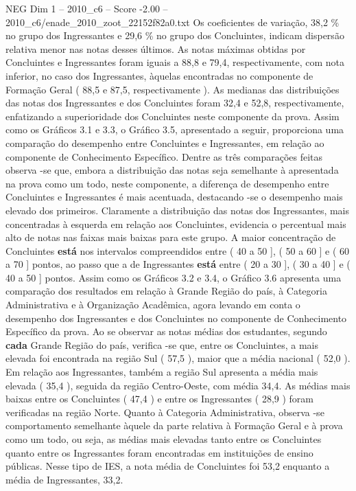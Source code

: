 \begin{textsample}{NEG Dim 1 – 2010\_c6 – Score -2.00 – 2010\_c6/enade\_2010\_zoot\_22152f82a0.txt}
Os coeficientes de variação, 38,2 \% no grupo dos Ingressantes e 29,6 \% no grupo dos Concluintes, indicam dispersão relativa menor nas notas desses últimos.
As notas máximas obtidas por Concluintes e Ingressantes foram iguais a 88,8 e 79,4, respectivamente, com nota inferior, no caso dos Ingressantes, àquelas encontradas no componente de Formação Geral ( 88,5 e 87,5, respectivamente ).
As medianas das distribuições das notas dos Ingressantes e dos Concluintes foram 32,4 e 52,8, respectivamente, enfatizando a superioridade dos Concluintes neste componente da prova.
Assim como os Gráficos 3.1 e 3.3, o Gráfico 3.5, apresentado a seguir, proporciona uma comparação do desempenho entre Concluintes e Ingressantes, em relação ao componente de Conhecimento Específico.
Dentre as três comparações feitas observa -se que, embora a distribuição das notas seja semelhante à apresentada na prova como um todo, neste componente, a diferença de desempenho entre Concluintes e Ingressantes é mais acentuada, destacando -se o desempenho mais elevado dos primeiros.
Claramente a distribuição das notas dos Ingressantes, mais concentradas à esquerda em relação aos Concluintes, evidencia o percentual mais alto de notas nas faixas mais baixas para este grupo.
A maior concentração de Concluintes \textbf{está} nos intervalos compreendidos entre ( 40 a 50 ], ( 50 a 60 ] e ( 60 a 70 ] pontos, ao passo que a de Ingressantes \textbf{está} entre ( 20 a 30 ], ( 30 a 40 ] e ( 40 a 50 ] pontos.
Assim como os Gráficos 3.2 e 3.4, o Gráfico 3.6 apresenta uma comparação dos resultados em relação à Grande Região do país, à Categoria Administrativa e à Organização Acadêmica, agora levando em conta o desempenho dos Ingressantes e dos Concluintes no componente de Conhecimento Específico da prova.
Ao se observar as notas médias dos estudantes, segundo \textbf{cada} Grande Região do país, verifica -se que, entre os Concluintes, a mais elevada foi encontrada na região Sul ( 57,5 ), maior que a média nacional ( 52,0 ).
Em relação aos Ingressantes, também a região Sul apresenta a média mais elevada ( 35,4 ), seguida da região Centro-Oeste, com média 34,4.
As médias mais baixas entre os Concluintes ( 47,4 ) e entre os Ingressantes ( 28,9 ) foram verificadas na região Norte.
Quanto à Categoria Administrativa, observa -se comportamento semelhante àquele da parte relativa à Formação Geral e à prova como um todo, ou seja, as médias mais elevadas tanto entre os Concluintes quanto entre os Ingressantes foram encontradas em instituições de ensino públicas.
Nesse tipo de IES, a nota média de Concluintes foi 53,2 enquanto a média de Ingressantes, 33,2.

\end{textsample}
